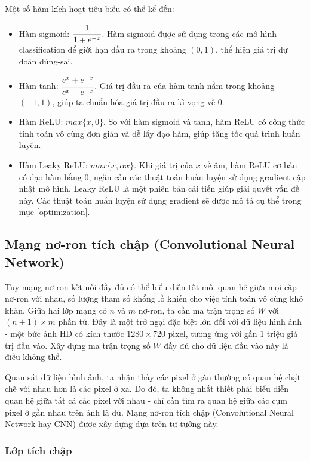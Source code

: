 \documentclass[12pt]{extreport}
\begin{document}
Một số hàm kích hoạt tiêu biểu có thể kể đến:
\begin{itemize}
    \item Hàm sigmoid: $ \cfrac{1}{1 + e^{-x}} $. Hàm sigmoid được sử dụng trong các mô hình classification để giới hạn đầu ra trong khoảng $ (0, 1) $, thể hiện giá trị dự đoán đúng-sai.
    \item Hàm tanh: $ \cfrac{e^{x} + e^{-x}}{e^{x} - e^{-x}} $. Giá trị đầu ra của hàm tanh nằm trong khoảng $ (-1, 1) $, giúp ta chuẩn hóa giá trị đầu ra kì vọng về 0.
    \item Hàm ReLU: $ max\{x, 0\} $. So với hàm sigmoid và tanh, hàm ReLU có công thức tính toán vô cùng đơn giản và dễ lấy đạo hàm, giúp tăng tốc quá trình huấn luyện.
    \item Hàm Leaky ReLU: $ max\{x, \alpha x\} $. Khi giá trị của $ x $ về âm, hàm ReLU cơ bản có đạo hàm bằng 0, ngăn cản các thuật toán huấn luyện sử dụng gradient cập nhật mô hình. Leaky ReLU là một phiên bản cải tiến giúp giải quyết vấn đề này. Các thuật toán huấn luyện sử dụng gradient sẽ được mô tả cụ thể trong mục \ref{optimization}.
\end{itemize}

\subsection{Mạng nơ-ron tích chập (Convolutional Neural Network)}

Tuy mạng nơ-ron kết nối đầy đủ có thể biểu diễn tốt mối quan hệ giữa mọi cặp nơ-ron với nhau, số lượng tham số khổng lồ khiến cho việc tính toán vô cùng khó khăn. Giữa hai lớp mạng có $ n $ và $ m $ nơ-ron, ta cần ma trận trọng số $ W $ với $ (n + 1) \times m $ phần tử. Đây là một trở ngại đặc biệt lớn đối với dữ liệu hình ảnh - một bức ảnh HD có kích thước $ 1280 \times 720 $ pixel, tương ứng với gần 1 triệu giá trị đầu vào. Xây dựng ma trận trọng số $ W $ đầy đủ cho dữ liệu đầu vào này là điều không thể.

Quan sát dữ liệu hình ảnh, ta nhận thấy các pixel ở gần thường có quan hệ chặt chẽ với nhau hơn là các pixel ở xa. Do đó, ta không nhất thiết phải biểu diễn quan hệ giữa tất cả các pixel với nhau - chỉ cần tìm ra quan hệ giữa các cụm pixel ở gần nhau trên ảnh là đủ. Mạng nơ-ron tích chập (Convolutional Neural Network hay CNN) được xây dựng dựa trên tư tưởng này.

\subsubsection{Lớp tích chập}
\label{convolutional-layer}
\end{document}
